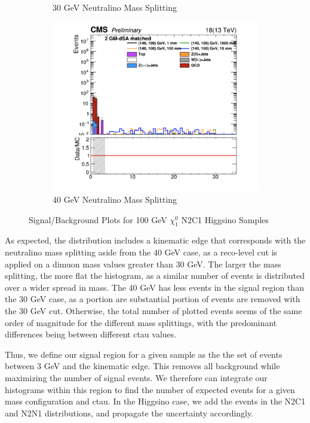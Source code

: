 \documentclass{article}
\begin{document}
\begin{figure} [H]
\begin{subfigure}{.5\textwidth}
  \caption{30 GeV Neutralino Mass Splitting}
  \label{fig:sub-third18}
\end{subfigure}
\begin{subfigure}{.5\textwidth}
  \centering
  \includegraphics[width=.8\linewidth]{Split40.png}  
  \caption{40 GeV Neutralino Mass Splitting}
  \label{fig:sub-fourth18}
\end{subfigure}
\caption{Signal/Background Plots for 100 GeV $\chi_{1}^{0}$ N2C1 Higgsino Samples}
\label{fig:18}
\end{figure}
\par
As expected, the distribution includes a kinematic edge that corresponds with the neutralino mass splitting aside from the 40 GeV case, as a reco-level cut is applied on a dimuon mass values greater than 30 GeV. The larger the mass splitting, the more flat the histogram, as a similar number of events is distributed over a wider spread in mass. The 40 GeV has less events in the signal region than the 30 GeV case, as a portion are substantial portion of events are removed with the 30 GeV cut. Otherwise, the total number of plotted events seems of the same order of magnitude for the different mass splittings, with the predominant differences being between different ctau values.
\par
Thus, we define our signal region for a given sample as the the set of events between 3 GeV and the kinematic edge. This removes all background while maximizing the number of signal events. We therefore can integrate our histograms within this region to find the number of expected events for a given mass configuration and ctau. In the Higgsino case, we add the events in the N2C1 and N2N1 distributions, and propagate the uncertainty accordingly. 
\end{document}

